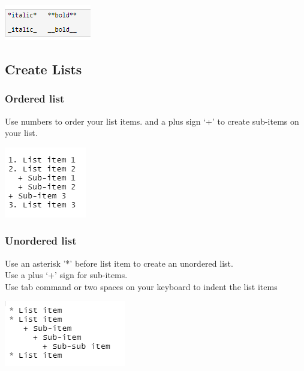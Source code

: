 \documentclass[
]{book}
\let\origfigure\figure
\let\endorigfigure\endfigure
\renewenvironment{figure}[1][2] {
    \expandafter\origfigure\expandafter[H]
} {
    \endorigfigure
}
\begin{document}
\begin{figure}
\centering
\includegraphics{tutorial_screenshots/italics_bold.png}
\caption{text emphasis}
\end{figure}

\hypertarget{create-lists}{%
\subsection{Create Lists}\label{create-lists}}

\hypertarget{ordered-list}{%
\subsubsection{Ordered list}\label{ordered-list}}

Use numbers to order your list items.
and a plus sign `+' to create sub-items on your list.

\begin{figure}
\centering
\includegraphics{tutorial_screenshots/ordered_list.png}
\caption{ordered list}
\end{figure}

\hypertarget{unordered-list}{%
\subsubsection{Unordered list}\label{unordered-list}}

Use an asterisk '*' before list item to create an unordered list.\\
Use a plus `+' sign for sub-items.\\
Use tab command or two spaces on your keyboard to indent the list items

\begin{figure}
\centering
\includegraphics{tutorial_screenshots/unordered_list.png}
\caption{unodered list}
\end{figure}
\end{document}
